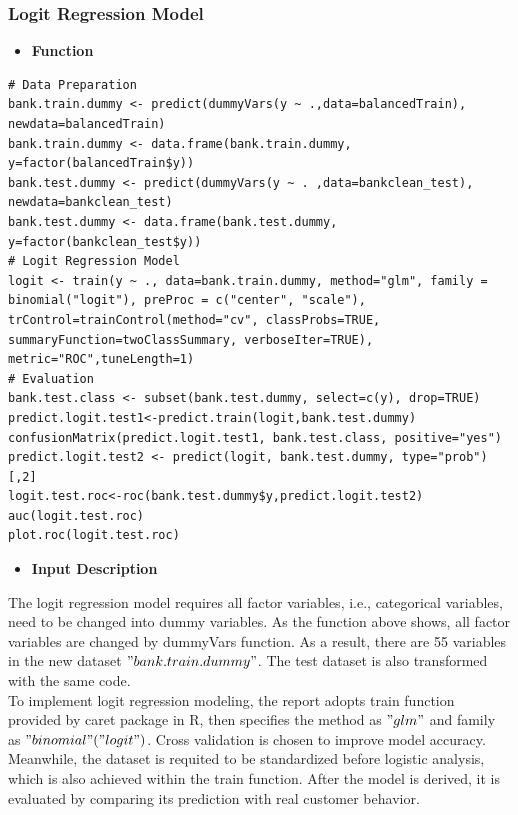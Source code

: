       \subsubsection{Logit Regression Model}
       \begin{itemize}
     	\item \textbf{Function}
       \end{itemize}
       \begin{lstlisting}
# Data Preparation
bank.train.dummy <- predict(dummyVars(y ~ .,data=balancedTrain), newdata=balancedTrain)
bank.train.dummy <- data.frame(bank.train.dummy, y=factor(balancedTrain$y))
bank.test.dummy <- predict(dummyVars(y ~ . ,data=bankclean_test), newdata=bankclean_test)
bank.test.dummy <- data.frame(bank.test.dummy, y=factor(bankclean_test$y))
# Logit Regression Model
logit <- train(y ~ ., data=bank.train.dummy, method="glm", family = binomial("logit"), preProc = c("center", "scale"), trControl=trainControl(method="cv", classProbs=TRUE, summaryFunction=twoClassSummary, verboseIter=TRUE), metric="ROC",tuneLength=1)
# Evaluation
bank.test.class <- subset(bank.test.dummy, select=c(y), drop=TRUE)
predict.logit.test1<-predict.train(logit,bank.test.dummy)
confusionMatrix(predict.logit.test1, bank.test.class, positive="yes") 
predict.logit.test2 <- predict(logit, bank.test.dummy, type="prob")[,2]
logit.test.roc<-roc(bank.test.dummy$y,predict.logit.test2)
auc(logit.test.roc)
plot.roc(logit.test.roc)
       \end{lstlisting}
       \begin{itemize}
       \item \textbf{Input Description}
       \end{itemize}
       \noindent The logit regression model requires all factor variables, i.e., categorical variables, need to be changed into dummy variables. As the function above shows, all factor variables are changed by dummyVars function. As a result, there are 55 variables in the new dataset $"bank.train.dummy"$. The test dataset is also transformed with the same code.\\
       [\baselineskip]\indent To implement logit regression modeling, the report adopts train function provided by caret package in R, then specifies the method as $"glm"$ and family as $"binomial"("logit")$. Cross validation is chosen to improve model accuracy. Meanwhile, the dataset is requited to be standardized before logistic analysis, which is also achieved within the train function. After the model is derived, it is evaluated by comparing its prediction with real customer behavior.\\
